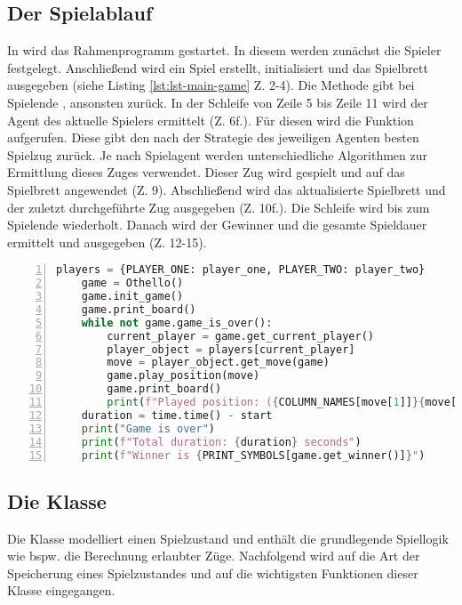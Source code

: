 \subsection{Der Spielablauf}
In  wird das Rahmenprogramm gestartet. In diesem werden zunächst die Spieler festgelegt. Anschließend wird ein Spiel erstellt, initialisiert und das Spielbrett ausgegeben (siehe Listing \ref{lst:lst-main-game} Z. 2-4). Die Methode  gibt bei Spielende , ansonsten  zurück. In der Schleife von Zeile 5 bis Zeile 11 wird der Agent des aktuelle Spielers ermittelt (Z. 6f.). Für diesen wird die Funktion  aufgerufen. Diese gibt den nach der Strategie des jeweiligen Agenten besten Spielzug zurück. Je nach Spielagent werden unterschiedliche Algorithmen zur Ermittlung dieses Zuges verwendet. Dieser Zug wird gespielt und auf das Spielbrett angewendet (Z. 9). Abschließend wird das aktualisierte Spielbrett und der zuletzt durchgeführte Zug ausgegeben (Z. 10f.). Die Schleife wird bis zum Spielende wiederholt. Danach wird der Gewinner und die gesamte Spieldauer ermittelt und ausgegeben (Z. 12-15). 
\begin{lstlisting}[basicstyle=\footnotesize, caption = {Spielablauf in \mxZitat{main-game.py}}, language = python, captionpos = t , numbers=left, label={lst:lst-main-game}]
    players = {PLAYER_ONE: player_one, PLAYER_TWO: player_two}
    game = Othello()
    game.init_game()
    game.print_board()
    while not game.game_is_over():
        current_player = game.get_current_player()
        player_object = players[current_player]
        move = player_object.get_move(game)
        game.play_position(move)
        game.print_board()
        print(f"Played position: ({COLUMN_NAMES[move[1]]}{move[0] + 1})")
    duration = time.time() - start
    print("Game is over")
    print(f"Total duration: {duration} seconds")
    print(f"Winner is {PRINT_SYMBOLS[game.get_winner()]}")
\end{lstlisting}
\subsection{Die Klasse }
\label{ot1}
Die Klasse  modelliert einen Spielzustand und enthält die grundlegende Spiellogik wie bspw. die Berechnung erlaubter Züge. Nachfolgend wird auf die Art der Speicherung eines Spielzustandes und auf die wichtigsten Funktionen dieser Klasse eingegangen.
